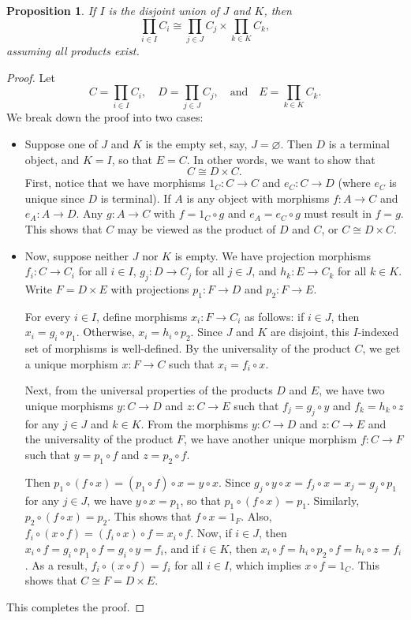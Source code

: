 \documentclass[12pt]{article}
\newtheorem{prop}{Proposition}
\begin{document}
\begin{prop}  If $I$ is the disjoint union of $J$ and $K$, then $$\prod_{i\in I} C_i \cong \prod_{j\in J} C_j \times \prod_{k\in K} C_k,$$ assuming all products exist.
\end{prop}
\begin{proof}  Let $$C=\prod_{i\in I} C_i, \quad D=\prod_{j\in J} C_j, \quad\mbox{and}\quad E=\prod_{k\in K} C_k.$$  We break down the proof into two cases:
\begin{itemize}
\item
Suppose one of $J$ and $K$ is the empty set, say, $J=\varnothing$.  Then $D$ is a terminal object, and $K=I$, so that $E=C$.  In other words, we want to show that $$C\cong D\times C.$$  First, notice that we have morphisms $1_C:C\to C$ and $e_C:C\to D$ (where $e_C$ is unique since $D$ is terminal).  If $A$ is any object with morphisms $f:A\to C$ and $e_A: A\to D$.  Any $g:A\to C$ with $f=1_C\circ g$ and $e_A = e_C\circ g$ must result in $f=g$.  This shows that $C$ may be viewed as the product of $D$ and $C$, or $C\cong D\times C$.
\item
Now, suppose neither $J$ nor $K$ is empty.  We have projection morphisms $f_i:C\to C_i$ for all $i\in I$, $g_j:D\to C_j$ for all $j\in J$, and $h_k:E\to C_k$ for all $k\in K$.  Write $F=D\times E$ with projections $p_1:F\to D$ and $p_2: F\to E$.  

For every $i\in I$, define morphisms $x_i:F\to C_i$ as follows: if $i\in J$, then $x_i=g_i\circ p_1$.  Otherwise, $x_i=h_i\circ p_2$.  Since $J$ and $K$ are disjoint, this $I$-indexed set of morphisms is well-defined.  By the universality of the product $C$, we get a unique morphism $x:F\to C$ such that $x_i=f_i\circ x$.  

Next, from the universal properties of the products $D$ and $E$, we have two unique morphisms $y:C\to D$ and $z:C\to E$ such that $f_j = g_j\circ y$ and $f_k=h_k\circ z$ for any $j\in J$ and $k\in K$.  From the morphisms $y:C\to D$ and $z:C\to E$ and the universality of the product $F$, we have another unique morphism $f:C\to F$ such that $y=p_1\circ f$ and $z=p_2\circ f$.

Then $p_1\circ (f \circ x) = (p_1\circ f)\circ x=y\circ x$.  Since $g_j\circ y \circ x=f_j\circ x=x_j=g_j\circ p_1$ for any $j\in J$, we have $y\circ x=p_1$, so that $p_1\circ (f\circ x)=p_1$.  Similarly, $p_2\circ (f\circ x)=p_2$.  This shows that $f\circ x=1_F$.  Also, $f_i\circ ( x\circ f) = (f_i\circ x)\circ f = x_i \circ f$.  Now, if $i\in J$, then $x_i\circ f = g_i\circ p_1 \circ f = g_i \circ y = f_i$, and if $i\in K$, then $x_i\circ f = h_i\circ p_2 \circ f = h_i \circ z = f_i$.  As a result, $f_i\circ (x\circ f)=f_i$ for all $i\in I$, which implies $x\circ f = 1_C$.  This shows that $C\cong F=D\times E$.
\end{itemize}
This completes the proof.
\end{proof}
\end{document}
